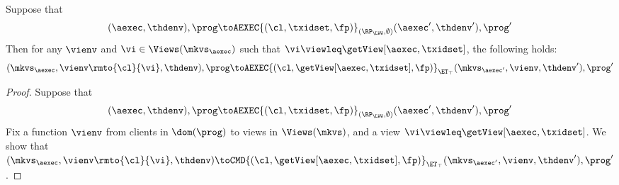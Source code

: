 \begin{proposition}
\label{prop:aexec2kv_transition}
Suppose that 
\[(\aexec, \thdenv), \prog \toAEXEC{(\cl, \txidset, \fp)}_{(\RP_{\LWW}, \emptyset)} (\aexec', \thdenv'), \prog'\]
Then for any $\vienv$ and $\vi \in \Views(\mkvs_{\aexec})$ such that $\vi \viewleq \getView[\aexec, \txidset]$, 
the following holds:
\[
    (\mkvs_{\aexec}, \vienv\rmto{\cl}{\vi}, \thdenv), \prog 
    \toAEXEC{(\cl, \getView[\aexec, \txidset], \fp)}_{\ET_{\top}} (\mkvs_{\aexec'}, \vienv, \thdenv'), \prog'
\]
\end{proposition}
\begin{proof}
Suppose that \[(\aexec, \thdenv), \prog \toAEXEC{(\cl, \txidset, \fp)}_{(\RP_{\LWW}, \emptyset)} (\aexec', \thdenv'), \prog'\]
Fix a function $\vienv$ from clients in $\dom(\prog)$ to views in $\Views(\mkvs)$, and a view $\vi \viewleq \getView[\aexec, \txidset]$.
We show that 
$(\mkvs_{\aexec}, \vienv\rmto{\cl}{\vi}, \thdenv) \toCMD{(\cl, \getView[\aexec, \txidset], \fp)}_{\ET_{\top}} (\mkvs_{\aexec'}, 
\vienv, \thdenv'), \prog'$. 


\end{proof}
